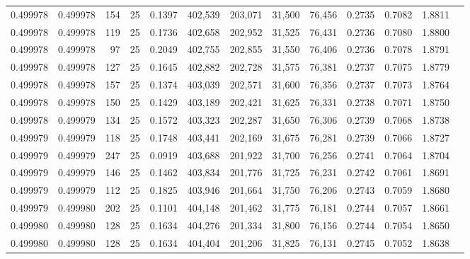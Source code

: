 \begin{tabular}{rrrrrrrrrrrrr}
0.499978 & 0.499978 &   154 &  25 &                                     0.1397 & 402,539 & 203,071 &  31,500 &  76,456 & 0.2735 & 0.7082 & 1.8811 \\
0.499978 & 0.499978 &   119 &  25 &                                     0.1736 & 402,658 & 202,952 &  31,525 &  76,431 & 0.2736 & 0.7080 & 1.8800 \\
0.499978 & 0.499978 &    97 &  25 &                                     0.2049 & 402,755 & 202,855 &  31,550 &  76,406 & 0.2736 & 0.7078 & 1.8791 \\
0.499978 & 0.499978 &   127 &  25 &                                     0.1645 & 402,882 & 202,728 &  31,575 &  76,381 & 0.2737 & 0.7075 & 1.8779 \\
0.499978 & 0.499978 &   157 &  25 &                                     0.1374 & 403,039 & 202,571 &  31,600 &  76,356 & 0.2737 & 0.7073 & 1.8764 \\
0.499978 & 0.499978 &   150 &  25 &                                     0.1429 & 403,189 & 202,421 &  31,625 &  76,331 & 0.2738 & 0.7071 & 1.8750 \\
0.499978 & 0.499979 &   134 &  25 &                                     0.1572 & 403,323 & 202,287 &  31,650 &  76,306 & 0.2739 & 0.7068 & 1.8738 \\
0.499979 & 0.499979 &   118 &  25 &                                     0.1748 & 403,441 & 202,169 &  31,675 &  76,281 & 0.2739 & 0.7066 & 1.8727 \\
0.499979 & 0.499979 &   247 &  25 &                                     0.0919 & 403,688 & 201,922 &  31,700 &  76,256 & 0.2741 & 0.7064 & 1.8704 \\
0.499979 & 0.499979 &   146 &  25 &                                     0.1462 & 403,834 & 201,776 &  31,725 &  76,231 & 0.2742 & 0.7061 & 1.8691 \\
0.499979 & 0.499979 &   112 &  25 &                                     0.1825 & 403,946 & 201,664 &  31,750 &  76,206 & 0.2743 & 0.7059 & 1.8680 \\
0.499979 & 0.499980 &   202 &  25 &                                     0.1101 & 404,148 & 201,462 &  31,775 &  76,181 & 0.2744 & 0.7057 & 1.8661 \\
0.499980 & 0.499980 &   128 &  25 &                                     0.1634 & 404,276 & 201,334 &  31,800 &  76,156 & 0.2744 & 0.7054 & 1.8650 \\
0.499980 & 0.499980 &   128 &  25 &                                     0.1634 & 404,404 & 201,206 &  31,825 &  76,131 & 0.2745 & 0.7052 & 1.8638 \\

\end{tabular}
